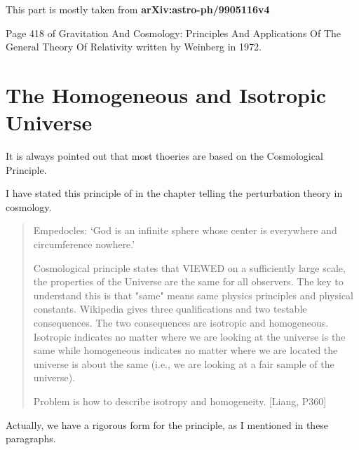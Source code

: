 \documentclass[12pt,a4paper]{book}
\begin{document}
This part is mostly taken from {\bf arXiv:astro-ph/9905116v4}

Page 418 of Gravitation And Cosmology: Principles And Applications Of The General Theory Of Relativity written by Weinberg in 1972.



















\section{The Homogeneous and Isotropic Universe}

It is always pointed out that most thoeries are based on the Cosmological Principle.

I have stated this principle of in the chapter telling the perturbation theory in cosmology.

\begin{quotation}
Empedocles: `God is an infinite sphere whose center is everywhere and circumference nowhere.'

Cosmological principle states that VIEWED on a sufficiently large scale, the properties of the Universe are the same for all observers. The key to understand this is that "same" means same physics principles and physical constants. 
Wikipedia gives three qualifications and two testable consequences. The two consequences are isotropic and homogeneous. Isotropic indicates no matter where we are looking at the universe is the same while homogeneous indicates no matter where we are located the universe is about the same (i.e., we are looking at a fair sample of the universe).

Problem is how to describe isotropy and homogeneity. [Liang, P360]
\end{quotation}

Actually, we have a rigorous form for the principle, as I mentioned in these paragraphs.
\end{document}
